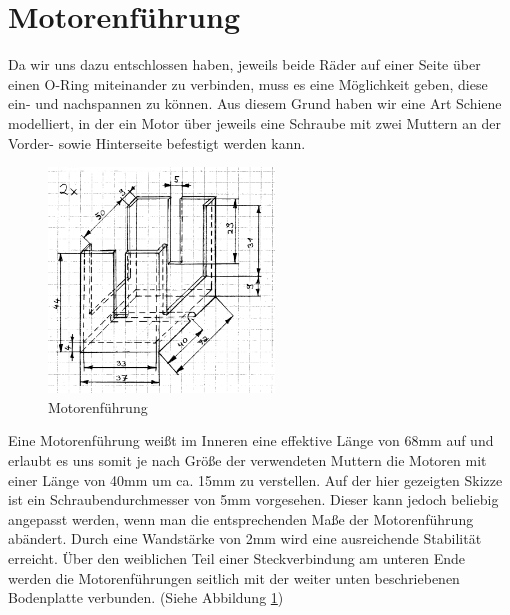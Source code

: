 \section{Motorenführung}
Da wir uns dazu entschlossen haben, jeweils beide Räder auf einer Seite über einen O-Ring miteinander zu verbinden, muss es eine Möglichkeit geben, diese ein- und nachspannen zu können. Aus diesem Grund haben wir eine Art Schiene modelliert, in der ein Motor über jeweils eine Schraube mit zwei Muttern an der Vorder- sowie Hinterseite befestigt werden kann.
\begin{figure}
	\includegraphics[width=6cm,angle=0]{content/pictures/motorenfuehrung.png}
	\caption{Motorenführung}
	\label{fig:motorenfuehrung}
\end{figure}
Eine Motorenführung weißt im Inneren eine effektive Länge von 68mm auf und erlaubt es uns somit je nach Größe der verwendeten Muttern die Motoren mit einer Länge von 40mm um ca. 15mm zu verstellen. Auf der hier gezeigten Skizze ist ein Schraubendurchmesser von 5mm vorgesehen. Dieser kann jedoch beliebig angepasst werden, wenn man die entsprechenden Maße der Motorenführung abändert. Durch eine Wandstärke von 2mm wird eine ausreichende Stabilität erreicht. Über den weiblichen Teil einer Steckverbindung am unteren Ende werden die Motorenführungen seitlich mit der weiter unten beschriebenen Bodenplatte verbunden. (Siehe Abbildung \ref{fig:motorenfuehrung})

